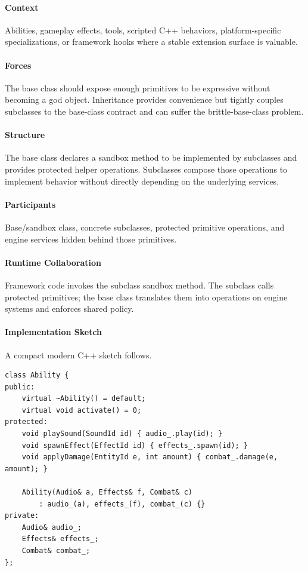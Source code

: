 \documentclass[11pt]{article}
\begin{document}
\paragraph{Context} Abilities, gameplay effects, tools, scripted C++ behaviors, platform-specific specializations, or framework hooks where a stable extension surface is valuable.
\paragraph{Forces} The base class should expose enough primitives to be expressive without becoming a god object. Inheritance provides convenience but tightly couples subclasses to the base-class contract and can suffer the brittle-base-class problem.
\paragraph{Structure} The base class declares a sandbox method to be implemented by subclasses and provides protected helper operations. Subclasses compose those operations to implement behavior without directly depending on the underlying services.
\paragraph{Participants} Base/sandbox class, concrete subclasses, protected primitive operations, and engine services hidden behind those primitives.
\paragraph{Runtime Collaboration} Framework code invokes the subclass sandbox method. The subclass calls protected primitives; the base class translates them into operations on engine systems and enforces shared policy.
\paragraph{Implementation Sketch} A compact modern C++ sketch follows.
\begin{lstlisting}
class Ability {
public:
    virtual ~Ability() = default;
    virtual void activate() = 0;
protected:
    void playSound(SoundId id) { audio_.play(id); }
    void spawnEffect(EffectId id) { effects_.spawn(id); }
    void applyDamage(EntityId e, int amount) { combat_.damage(e, amount); }

    Ability(Audio& a, Effects& f, Combat& c)
        : audio_(a), effects_(f), combat_(c) {}
private:
    Audio& audio_;
    Effects& effects_;
    Combat& combat_;
};
\end{lstlisting}
\end{document}
